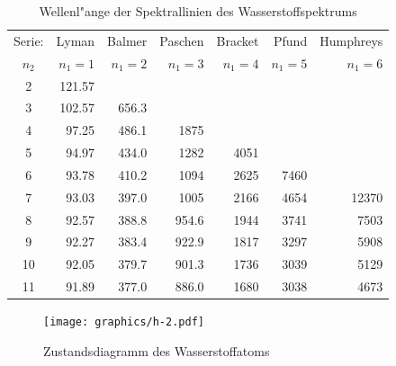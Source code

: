 \begin{table}
\begin{center}
\begin{tabular}{crrrrrr}
\hline
Serie:&  Lyman  &  Balmer & Paschen          & Bracket &  Pfund  & Humphreys \\
$n_2$ & $n_1=1$ & $n_1=2$ & $n_1=3$          & $n_1=4$ & $n_1=5$ & $n_1=6$   \\
\hline
    2 &  121.57 &         &                  &         &         &           \\
    3 &  102.57 &   656.3 &                  &         &         &           \\
    4 &   97.25 &   486.1 &  1875\phantom{.0}&         &         &           \\
    5 &   94.97 &   434.0 &  1282\phantom{.0}&  4051   &         &           \\
    6 &   93.78 &   410.2 &  1094\phantom{.0}&  2625   &   7460  &           \\
    7 &   93.03 &   397.0 &  1005\phantom{.0}&  2166   &   4654  & 12370     \\
    8 &   92.57 &   388.8 &   954.6          &  1944   &   3741  &  7503     \\
    9 &   92.27 &   383.4 &   922.9          &  1817   &   3297  &  5908     \\
   10 &   92.05 &   379.7 &   901.3          &  1736   &   3039  &  5129     \\
   11 &   91.89 &   377.0 &   886.0          &  1680   &   3038  &  4673     \\
\hline
\end{tabular}
\end{center}
\caption{Wellenl"ange der Spektrallinien des Wasserstoffspektrums
\label{skript:h2wellenlaengen}}
\end{table}

\begin{figure}
\centering
\texttt{[image: graphics/h-2.pdf]}
\caption{Zustandsdiagramm des Wasserstoffatoms
\label{skript:zustandsdiagramm}}
\end{figure}

